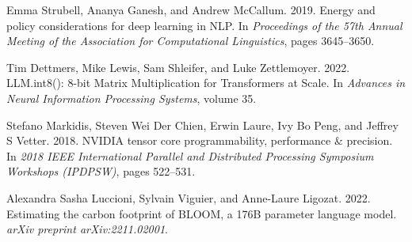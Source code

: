 \documentclass[sigconf]{acmart}
\begin{document}

\begin{thebibliography}{9}

Emma Strubell, Ananya Ganesh, and Andrew McCallum. 2019. Energy and policy considerations for deep learning in NLP. In \textit{Proceedings of the 57th Annual Meeting of the Association for Computational Linguistics}, pages 3645--3650.

Tim Dettmers, Mike Lewis, Sam Shleifer, and Luke Zettlemoyer. 2022. LLM.int8(): 8-bit Matrix Multiplication for Transformers at Scale. In \textit{Advances in Neural Information Processing Systems}, volume 35.

Stefano Markidis, Steven Wei Der Chien, Erwin Laure, Ivy Bo Peng, and Jeffrey S Vetter. 2018. NVIDIA tensor core programmability, performance \& precision. In \textit{2018 IEEE International Parallel and Distributed Processing Symposium Workshops (IPDPSW)}, pages 522--531.

Alexandra Sasha Luccioni, Sylvain Viguier, and Anne-Laure Ligozat. 2022. Estimating the carbon footprint of BLOOM, a 176B parameter language model. \textit{arXiv preprint arXiv:2211.02001}.

\end{thebibliography}
\end{document}
